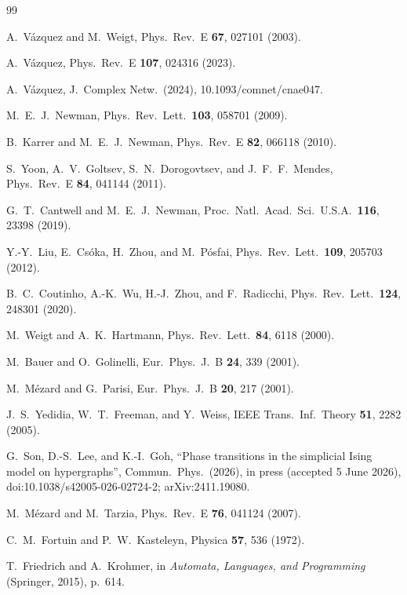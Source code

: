 \documentclass[aps,pre,twocolumn,superscriptaddress,floatfix]{revtex4-2}
\begin{document}
\begin{thebibliography}{99}

 A.\ V\'azquez and M.\ Weigt,
  Phys.\ Rev.\ E \textbf{67}, 027101 (2003).

 A.\ V\'azquez,
  Phys.\ Rev.\ E \textbf{107}, 024316 (2023).

 A.\ V\'azquez,
  J.\ Complex Netw.\ (2024), 10.1093/comnet/cnae047.

 M.\ E.\ J.\ Newman,
  Phys.\ Rev.\ Lett.\ \textbf{103}, 058701 (2009).

 B.\ Karrer and M.\ E.\ J.\ Newman,
  Phys.\ Rev.\ E \textbf{82}, 066118 (2010).

 S.\ Yoon, A.\ V.\ Goltsev, S.\ N.\ Dorogovtsev, and
  J.\ F.\ F.\ Mendes, Phys.\ Rev.\ E \textbf{84}, 041144 (2011).

 G.\ T.\ Cantwell and M.\ E.\ J.\ Newman,
  Proc.\ Natl.\ Acad.\ Sci.\ U.S.A.\ \textbf{116}, 23398 (2019).

 Y.-Y.\ Liu, E.\ Cs\'oka, H.\ Zhou, and M.\ P\'osfai,
  Phys.\ Rev.\ Lett.\ \textbf{109}, 205703 (2012).

 B.\ C.\ Coutinho, A.-K.\ Wu, H.-J.\ Zhou, and F.\ Radicchi,
  Phys.\ Rev.\ Lett.\ \textbf{124}, 248301 (2020).

 M.\ Weigt and A.\ K.\ Hartmann,
  Phys.\ Rev.\ Lett.\ \textbf{84}, 6118 (2000).

 M.\ Bauer and O.\ Golinelli,
  Eur.\ Phys.\ J.\ B \textbf{24}, 339 (2001).

 M.\ M\'ezard and G.\ Parisi,
  Eur.\ Phys.\ J.\ B \textbf{20}, 217 (2001).

 J.\ S.\ Yedidia, W.\ T.\ Freeman, and Y.\ Weiss,
  IEEE Trans.\ Inf.\ Theory \textbf{51}, 2282 (2005).

 G.\ Son, D.-S.\ Lee, and K.-I.\ Goh,
  ``Phase transitions in the simplicial Ising model on hypergraphs'',
  Commun.\ Phys.\ (2026), in press (accepted 5 June 2026),
  \\ doi:10.1038/s42005-026-02724-2; arXiv:2411.19080.

 M.\ M\'ezard and M.\ Tarzia,
  Phys.\ Rev.\ E \textbf{76}, 041124 (2007).

 C.\ M.\ Fortuin and P.\ W.\ Kasteleyn,
  Physica \textbf{57}, 536 (1972).

 T.\ Friedrich and A.\ Krohmer,
  in \emph{Automata, Languages, and Programming} (Springer, 2015), p.\ 614.

\end{thebibliography}
\end{document}
